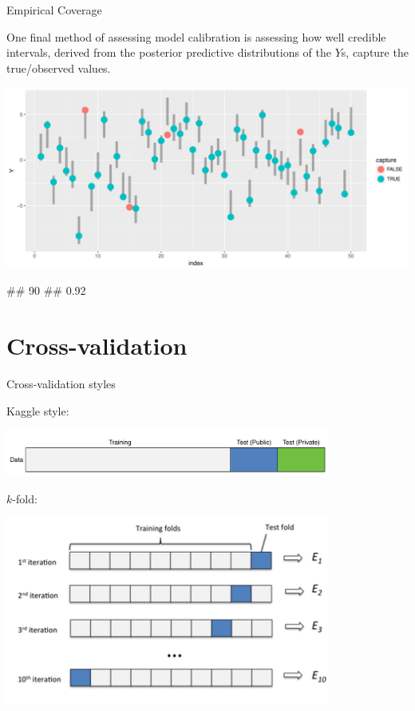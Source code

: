 \documentclass[11pt,ignorenonframetext,]{beamer}
\let\oldverbatim\verbatim
\let\endoldverbatim\endverbatim
\renewenvironment{verbatim}{\footnotesize\begin{spacing}{0.9}\oldverbatim}{\endoldverbatim\end{spacing}}
\begin{document}
\begin{frame}[fragile]{Empirical Coverage}

One final method of assessing model calibration is assessing how well
credible intervals, derived from the posterior predictive distributions
of the \(Y\)s, capture the true/observed values.

\pause

\includegraphics{Lec2_files/figure-beamer/unnamed-chunk-12-1.pdf}

\begin{verbatim}
## 90% CI empirical coverage 
##                      0.92
\end{verbatim}

\end{frame}

\section{Cross-validation}\label{cross-validation}

\begin{frame}{Cross-validation styles}

Kaggle style:

\begin{center}
\includegraphics[width=0.8\textwidth]{figs/kaggle.png}
\end{center}

\(k\)-fold:

\begin{center}
\includegraphics[width=0.8\textwidth]{figs/k-fold.png}
\end{center}

\end{frame}
\end{document}
